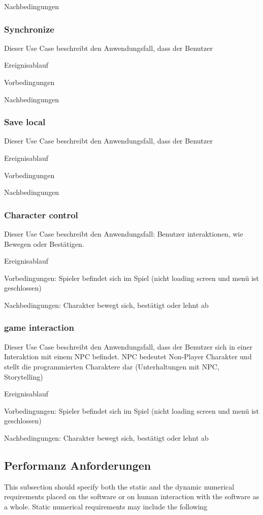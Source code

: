 			{Nachbedingungen
	
		\subsubsection{Synchronize}
			Dieser Use Case beschreibt den Anwendungsfall, dass der Benutzer 
			
			Ereignisablauf
	
			Vorbedingungen
			
			Nachbedingungen
	
		\subsubsection{Save local}
			Dieser Use Case beschreibt den Anwendungsfall, dass der Benutzer 
			
			Ereignisablauf
	
			Vorbedingungen
			
			Nachbedingungen
		
		\subsubsection{Character control}
			Dieser Use Case beschreibt den Anwendungsfall: Benutzer interaktionen, wie Bewegen oder Bestätigen.
			
			Ereignisablauf
			
			Vorbedingungen: Spieler befindet sich im Spiel (nicht loading screen und menü ist geschlossen)
			
			Nachbedingungen: Charakter bewegt sich, bestätigt oder lehnt ab
	
		\subsubsection{game interaction}
			Dieser Use Case beschreibt den Anwendungsfall, dass der Benutzer sich in einer Interaktion mit einem NPC befindet. NPC bedeutet Non-Player Charakter und stellt die programmierten Charaktere dar (Unterhaltungen mit NPC, Storytelling)
			
			Ereignisablauf
			
			Vorbedingungen: Spieler befindet sich im Spiel (nicht loading screen und menü ist geschlossen)
			
			Nachbedingungen: Charakter bewegt sich, bestätigt oder lehnt ab
	
	\subsection{Performanz Anforderungen}
		This subsection should specify both the static and the dynamic numerical requirements placed on the software or on human interaction with the software as a whole. Static numerical requirements may include the following
		
}
